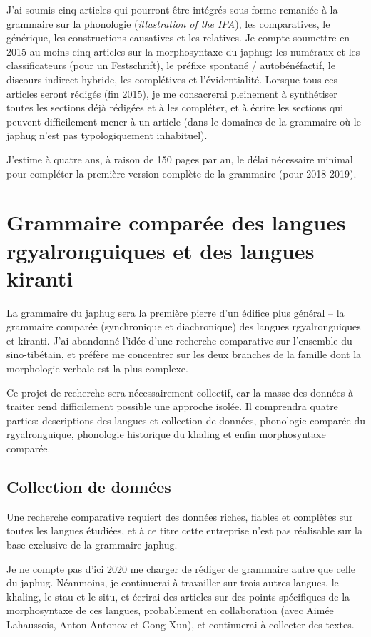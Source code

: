 \documentclass[oldfontcommands,oneside,a4paper,11pt]{article}
\begin{document}
  J'ai soumis cinq articles qui pourront être intégrés sous forme remaniée à la grammaire sur la phonologie (\textit{illustration of the IPA}), les comparatives, le générique, les constructions causatives et les relatives. Je compte soumettre en 2015 au moins cinq articles sur la morphosyntaxe du japhug: les numéraux et les classificateurs (pour un Festschrift), le préfixe spontané / autobénéfactif, le discours indirect hybride, les complétives et l'évidentialité. Lorsque tous ces articles seront rédigés (fin 2015), je me consacrerai pleinement  à synthétiser toutes les sections déjà rédigées et à les compléter, et à écrire les sections qui peuvent difficilement mener à un article (dans le domaines de la grammaire où le japhug n'est pas typologiquement inhabituel).

J'estime à quatre ans, à raison de 150 pages par an, le délai nécessaire minimal pour compléter la première version complète de la grammaire (pour 2018-2019).

\section{Grammaire comparée des langues rgyalronguiques et des langues kiranti}
La grammaire du japhug sera la première pierre d'un édifice plus général -- la grammaire comparée (synchronique et diachronique) des langues rgyalronguiques et kiranti. J'ai abandonné l'idée d'une recherche comparative sur l'ensemble du sino-tibétain, et préfère me concentrer sur les deux branches de la famille dont la morphologie verbale est la plus complexe.

Ce projet de recherche sera nécessairement collectif, car la masse des données à traiter rend difficilement possible une approche isolée. Il comprendra quatre parties: descriptions des langues et collection de données, phonologie comparée du rgyalronguique, phonologie historique du khaling et enfin morphosyntaxe comparée.

\subsection{Collection de données}
Une recherche comparative requiert des données riches, fiables et complètes sur toutes les langues étudiées, et à ce titre cette entreprise n'est pas réalisable sur la base exclusive de la grammaire japhug.

Je ne compte pas d'ici 2020 me charger de rédiger de grammaire autre que celle du japhug. Néanmoins, je continuerai à travailler sur trois autres langues, le khaling, le stau et le situ, et écrirai des articles sur des points spécifiques de la morphosyntaxe de ces langues, probablement en collaboration (avec Aimée Lahaussois, Anton Antonov et Gong Xun), et continuerai à collecter des textes. 
\end{document}
